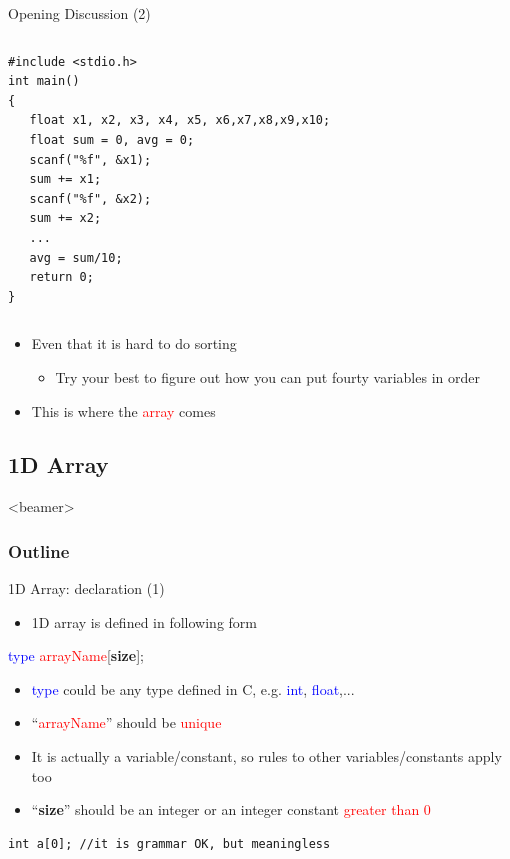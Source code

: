 \begin{frame}[fragile]{Opening Discussion (2)}
\vspace{-0.15in}
\begin{columns}
\begin{column}{0.75\linewidth}
\begin{lstlisting}
#include <stdio.h>
int main()
{
   float x1, x2, x3, x4, x5, x6,x7,x8,x9,x10;
   float sum = 0, avg = 0;
   scanf("%f", &x1);
   sum += x1;
   scanf("%f", &x2);
   sum += x2;
   ...
   avg = sum/10;
   return 0;
}

\end{lstlisting}
\end{column}
\end{columns}
\vspace{-0.15in}
\begin{itemize}
	\item {Even that it is hard to do sorting}
	\begin{itemize}
		\item {Try your best to figure out how you can put fourty variables in order}
	\end{itemize}
	\item {This is where the \textcolor{red}{array} comes}
\end{itemize}

\end{frame}

\subsection{1D Array}
\label{sec:1darry}
\begin{frame}<beamer>
    \frametitle{Outline}
\end{frame}

\begin{frame}[fragile]{1D Array: declaration (1)}
\begin{itemize}
	\item {1D array is defined in following form}
\end{itemize}
\begin{center}
 \LARGE{
	\textcolor{blue}{type} \textcolor{red}{arrayName}[\textbf{size}];
	}
\end{center}
\begin{itemize}
	\item {\textcolor{blue}{type} could be any type defined in C, e.g. \textcolor{blue}{int}, \textcolor{blue}{float},...}
	\item {``\textcolor{red}{arrayName}'' should be \textcolor{red}{unique}}
	\item {It is actually a variable/constant, so rules to other variables/constants apply too}
	\item {``\textbf{size}'' should be an integer or an integer constant \textcolor{red}{greater than 0}}
\end{itemize}
\begin{lstlisting}[xleftmargin=0.09\linewidth, linewidth=0.9\linewidth, frame=no, numbers=none]
int a[0]; //it is grammar OK, but meaningless
\end{lstlisting}
\end{frame}

